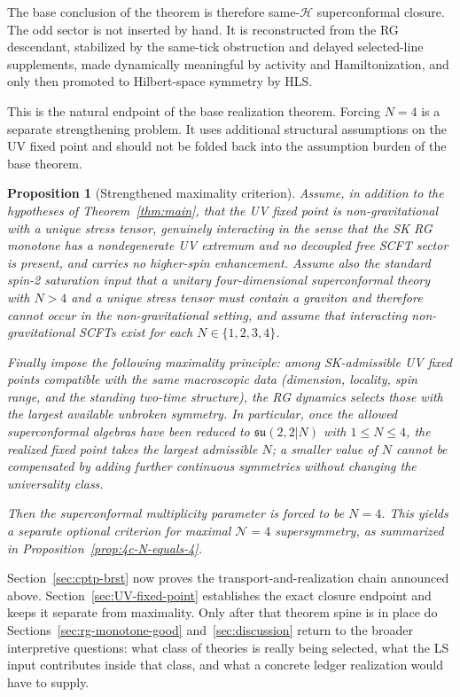 \documentclass[
  aps,
  prd,
  onecolumn,
  notitlepage,
  nofootinbib,
  superscriptaddress,
  10pt
]{revtex4-2}
\theoremstyle{definition}
\theoremstyle{plain}
\newtheorem{proposition}{Proposition}[section]
\begin{document}
The base conclusion of the theorem is therefore same-\(\mathcal H\)
superconformal closure.  The odd sector is not inserted by hand.  It is
reconstructed from the RG descendant, stabilized by the same-tick obstruction
and delayed selected-line supplements, made dynamically meaningful by activity
and Hamiltonization, and only then promoted to Hilbert-space symmetry by HLS.

This is the natural endpoint of the base realization theorem.  Forcing
\(N=4\) is a separate strengthening problem.  It uses additional structural
assumptions on the UV fixed point and should not be folded back into the
assumption burden of the base theorem.

\begin{proposition}[Strengthened maximality criterion]
\label{prop:main-optional-4c}
Assume, in addition to the hypotheses of Theorem~\ref{thm:main}, that the UV
fixed point is non-gravitational with a unique stress tensor, genuinely
interacting in the sense that the SK RG monotone has a nondegenerate UV
extremum and no decoupled free SCFT sector is present, and carries no
higher-spin enhancement.  Assume also the standard spin-2 saturation input
that a unitary four-dimensional superconformal theory with \(N>4\) and a
unique stress tensor must contain a graviton and therefore cannot occur in the
non-gravitational setting, and assume that interacting non-gravitational
SCFTs exist for each \(N\in\{1,2,3,4\}\).

Finally impose the following \emph{maximality principle}: among
SK-admissible UV fixed points compatible with the same macroscopic data
(dimension, locality, spin range, and the standing two-time structure), the
RG dynamics selects those with the largest available unbroken symmetry.  In
particular, once the allowed superconformal algebras have been reduced to
\(\mathfrak{su}(2,2|N)\) with \(1\le N\le4\), the realized fixed point takes
the largest admissible \(N\); a smaller value of \(N\) cannot be compensated
by adding further continuous symmetries without changing the universality
class.

Then the superconformal multiplicity parameter is forced to be \(N=4\).  This
yields a separate optional criterion for maximal \(\mathcal N=4\)
supersymmetry, as summarized in Proposition~\ref{prop:4c-N-equals-4}.
\end{proposition}

Section~\ref{sec:cptp-brst} now proves the transport-and-realization chain
announced above.  Section~\ref{sec:UV-fixed-point} establishes the exact closure
endpoint and keeps it separate from maximality.  Only after that theorem spine
is in place do Sections~\ref{sec:rg-monotone-good} and~\ref{sec:discussion}
return to the broader interpretive questions: what class of theories is really
being selected, what the LS input contributes inside that class, and what a
concrete ledger realization would have to supply.
\end{document}
